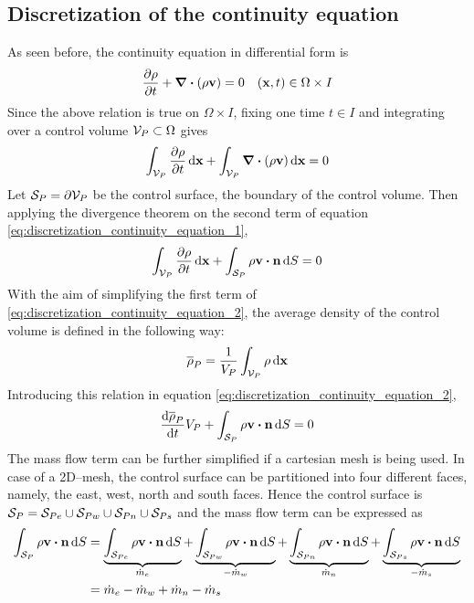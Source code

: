
\subsection{Discretization of the continuity equation}

As seen before, the continuity equation in differential form is
\begin{equation}
	\pdv{\rho}{t} + \div(\rho \vb{v}) = 0 \quad (\vb{x},t) \in \Omega \times I
\end{equation}
Since the above relation is true on $\Omega \times I$, fixing one time $t \in I$ and integrating over a control volume $\mathcal{V}_{P} \subset \Omega$ gives
\begin{equation} \label{eq:discretization_continuity_equation_1}
	\int_{\mathcal{V}_{P}} \pdv{\rho}{t} \dd{\vb{x}} + \int_{\mathcal{V}_{P}} \div(\rho \vb{v}) \dd{\vb{x}} = 0
\end{equation}
Let $\mathcal{S}_{P} = \partial \mathcal{V}_{P}$ be the control surface, \ie the boundary of the control volume. Then applying the divergence theorem on the second term of equation \eqref{eq:discretization_continuity_equation_1},
\begin{equation} \label{eq:discretization_continuity_equation_2}
	\int_{\cv{P}} \pdv{\rho}{t} \dd{\vb{x}} + 
	\int_{\cs{P}} \rho \vb{v} \vdot \vb{n} \dd{S} = 0
\end{equation}
With the aim of simplifying the first term of \eqref{eq:discretization_continuity_equation_2}, the average density of the control volume is defined in the following way:
\begin{equation}
	\overline{\rho}_P = \frac{1}{V_P} \int_{\mathcal{V}_{P}} \rho \dd{\vb{x}}
\end{equation}
Introducing this relation in equation \eqref{eq:discretization_continuity_equation_2},
\begin{equation} \label{eq:discretization_continuity_equation_3}
	\frac{\dd \overline{\rho}_P}{\dd{t}} V_P + 
	\int_{\cs{P}} \rho \vb{v} \vdot \vb{n} \dd{S} = 0
\end{equation}
The mass flow term can be further simplified if a cartesian mesh is being used. In case of a 2D--mesh, the control surface can be partitioned into four different faces, namely, the east, west, north and south faces. Hence the control surface is $\mathcal{S}_{P} = \mathcal{S}_{Pe} \cup \mathcal{S}_{Pw} \cup \mathcal{S}_{Pn} \cup \mathcal{S}_{Ps}$ and the mass flow term can be expressed as
\begin{align}
	\int_{\cs{P}} \rho \vb{v} \vdot \vb{n} \dd{S} 
	&= 
	\underbrace{\int_{\cs{Pe}} \rho \vb{v} \vdot \vb{n} \dd{S}}_{\dot{m}_e}
	+ \underbrace{\int_{\cs{Pw}} \rho \vb{v} \vdot \vb{n} \dd{S}}_{-\dot{m}_w}
	+ \underbrace{\int_{\cs{Pn}} \rho \vb{v} \vdot \vb{n} \dd{S}}_{\dot{m}_n}
	+ \underbrace{\int_{\cs{Ps}} \rho \vb{v} \vdot \vb{n} \dd{S}}_{-\dot{m}_s} \nonumber \\
	&= \dot{m}_e - \dot{m}_w + \dot{m}_n - \dot{m}_s \label{eq:discretization_continuity_equation_7}
\end{align}
